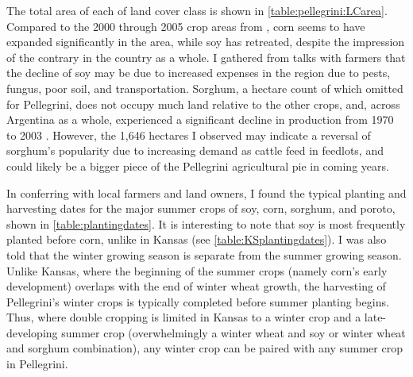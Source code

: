The total area of each of land cover class is shown in \autoref{table:pellegrini:LCarea}. Compared to the 2000 through 2005 crop areas from \textcite{volante2005analisis}, corn seems to have expanded significantly in the area, while soy has retreated, despite the impression of the contrary in the country as a whole. I gathered from talks with farmers that the decline of soy may be due to increased expenses in the region due to pests, fungus, poor soil, and transportation. Sorghum, a hectare count of which \citeauthor{volante2005analisis} omitted for Pellegrini, does not occupy much land relative to the other crops, and, across Argentina as a whole, experienced a significant decline in production from 1970 to 2003 \autocite{paruelo2005expansion}. However, the 1,646 hectares I observed may indicate a reversal of sorghum's popularity due to increasing demand as cattle feed in feedlots, and could likely be a bigger piece of the Pellegrini agricultural pie in coming years.

In conferring with local farmers and land owners, I found the typical planting and harvesting dates for the major summer crops of soy, corn, sorghum, and poroto, shown in \autoref{table:plantingdates}. It is interesting to note that soy is most frequently planted before corn, unlike in Kansas (see \autoref{table:KSplantingdates}). I was also told that the winter growing season is separate from the summer growing season. Unlike Kansas, where the beginning of the summer crops (namely corn's early development) overlaps with the end of winter wheat growth, the harvesting of Pellegrini's winter crops is typically completed before summer planting begins. Thus, where double cropping is limited in Kansas to a winter crop and a late-developing summer crop (overwhelmingly a winter wheat and soy or winter wheat and sorghum combination), any winter crop can be paired with any summer crop in Pellegrini.

